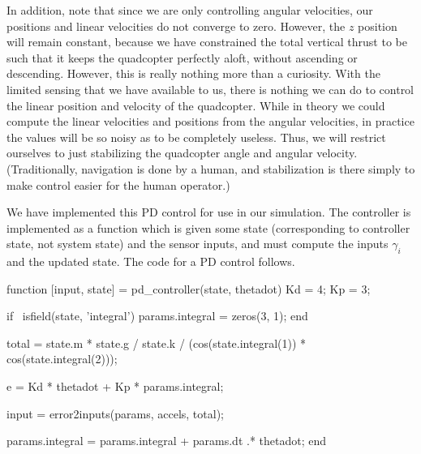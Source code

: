 \documentclass{article}
\begin{document}
In addition, note that since we are only controlling angular velocities, our positions and linear velocities do
not converge to zero. However, the $z$ position will remain constant, because we have constrained
the total vertical thrust to be such that it keeps the quadcopter perfectly aloft, without ascending
or descending. However, this is really nothing more than a curiosity. With the limited sensing that we have
available to us, there is nothing we can do to control the linear position and velocity of the
quadcopter. While in theory we could compute the linear velocities and positions from the angular
velocities, in practice the values will be so noisy as to be completely useless. Thus, we will
restrict ourselves to just stabilizing the quadcopter angle and angular velocity. (Traditionally,
navigation is done by a human, and stabilization is there simply to make control easier for the
human operator.)

\newpage
We have implemented this PD control for use in our simulation. The controller is implemented as a
function which is given some state (corresponding to controller state, not system state) and the
sensor inputs, and must compute the inputs $\gamma_i$ and the updated state. The code for a PD
control follows.
\begin{matlabcode}
function [input, state] = pd_controller(state, thetadot)
    Kd = 4;
    Kp = 3;

    if ~isfield(state, 'integral')
        params.integral = zeros(3, 1);
    end

    total = state.m * state.g / state.k / (cos(state.integral(1)) * cos(state.integral(2)));

    e = Kd * thetadot + Kp * params.integral;

    input = error2inputs(params, accels, total);

    params.integral = params.integral + params.dt .* thetadot;
end
\end{matlabcode}
\end{document}

